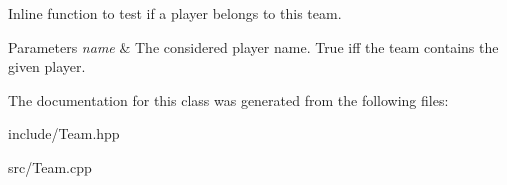 Inline function to test if a player belongs to this team. 


\begin{DoxyParams}{Parameters}
{\em name} & The considered player name.  True iff the team contains the given player. \\
\hline
\end{DoxyParams}


The documentation for this class was generated from the following files\-:\begin{DoxyCompactItemize}
\item 
include/Team.\-hpp\item 
src/Team.\-cpp\end{DoxyCompactItemize}

